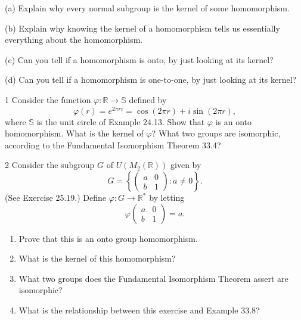 \begin{problem}[Warmup]{(a)}
    Explain why every normal subgroup is the kernel of some homomorphism.
\end{problem}
\unsolved

\begin{problem}[Warmup]{(b)}
    Explain why knowing the kernel of a homomorphism tells us essentially everything about the homomorphism.
\end{problem}
\unsolved

\begin{problem}[Warmup]{(c)}
    Can you tell if a homomorphism is onto, by just looking at its kernel?
\end{problem}
\unsolved

\begin{problem}[Warmup]{(d)}
    Can you tell if a homomorphism is one-to-one, by just looking at its kernel?
\end{problem}
\unsolved

\begin{problem}{1}
    Consider the function $\varphi : \mathbb{R} \to \mathbb{S}$ defined by
    \[\varphi(r) = e^{2\pi ri} = \cos(2\pi r) + i\sin(2\pi r),\]
    where $\mathbb{S}$ is the unit circle of Example 24.13. Show that $\varphi$ is an onto
    homomorphism. What is the kernel of $\varphi$? What two groups are isomorphic,
    according to the Fundamental Isomorphism Theorem 33.4?
\end{problem}
\unsolved

\begin{problem}{2}
    Consider the subgroup $G$ of $U(M_2(\mathbb{R}))$ given by
    \[G = \left\{\begin{pmatrix} a & 0 \\ b & 1 \end{pmatrix} : a \neq 0\right\}.\]
    (See Exercise 25.19.) Define $\varphi : G \to \mathbb{R}^*$ by letting
    \[\varphi\begin{pmatrix} a & 0 \\ b & 1 \end{pmatrix} = a.\]
    \begin{enumerate}
        \item[(a)] Prove that this is an onto group homomorphism.
        \item[(b)] What is the kernel of this homomorphism?
        \item[(c)] What two groups does the Fundamental Isomorphism Theorem assert are
        isomorphic?
        \item[(d)] What is the relationship between this exercise and Example 33.8?
    \end{enumerate}
\end{problem}
\unsolved

